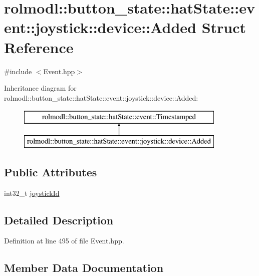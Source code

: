 \hypertarget{structrolmodl_1_1button__state_1_1hat_state_1_1event_1_1joystick_1_1device_1_1_added}{}\section{rolmodl\+::button\+\_\+state\+::hat\+State\+::event\+::joystick\+::device\+::Added Struct Reference}
\label{structrolmodl_1_1button__state_1_1hat_state_1_1event_1_1joystick_1_1device_1_1_added}


{\ttfamily \#include $<$Event.\+hpp$>$}

Inheritance diagram for rolmodl\+::button\+\_\+state\+::hat\+State\+::event\+::joystick\+::device\+::Added\+:\begin{figure}[H]
\begin{center}
\leavevmode
\includegraphics[height=2.000000cm]{structrolmodl_1_1button__state_1_1hat_state_1_1event_1_1joystick_1_1device_1_1_added}
\end{center}
\end{figure}
\subsection*{Public Attributes}
\begin{DoxyCompactItemize}
\item 
int32\+\_\+t \mbox{\hyperlink{structrolmodl_1_1button__state_1_1hat_state_1_1event_1_1joystick_1_1device_1_1_added_a90a80e6fa7a4424d68b4784cda159600}{joystick\+Id}}
\end{DoxyCompactItemize}


\subsection{Detailed Description}


Definition at line 495 of file Event.\+hpp.



\subsection{Member Data Documentation}
\mbox{\label{structrolmodl_1_1button__state_1_1hat_state_1_1event_1_1joystick_1_1device_1_1_added_a90a80e6fa7a4424d68b4784cda159600}} 
